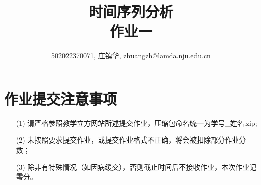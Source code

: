 \documentclass[a4paper,UTF8]{article}
\numberwithin{equation}{section}
\begin{document}
	\title{时间序列分析\\
		作业一}
	\author{502022370071, 庄镇华, \href{mailto:zhuangzh@lamda.nju.edu.cn}{zhuangzh@lamda.nju.edu.cn}}
	\maketitle

	\section*{作业提交注意事项}
	\begin{tcolorbox}
		\begin{enumerate}
			\item[(1)] 请严格参照教学立方网站所述提交作业，压缩包命名统一为{\color{red}学号\_姓名.zip};
			\item[(2)] 未按照要求提交作业，或提交作业格式不正确，将会被扣除部分作业分数；
			\item[(3)] 除非有特殊情况（如因病缓交），否则截止时间后不接收作业，本次作业记零分。
		\end{enumerate}
	\end{tcolorbox}
\end{document}
